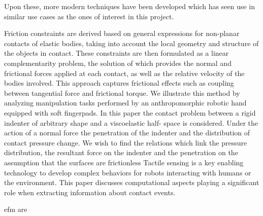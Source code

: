 Upon these, more modern techniques have been developed which has seen use in similar use cases as the ones of interest in this project.

Friction constraints are derived based on general expressions for non-planar contacts of elastic bodies, taking into account the local geometry and structure of the objects in contact. These constraints are then formulated as a linear complementarity problem, the solution of which provides the normal and frictional forces applied at each contact, as well as the relative velocity of the bodies involved. This approach captures frictional effects such as coupling between tangential force and frictional torque. We illustrate this method by analyzing manipulation tasks performed by an anthropomorphic robotic hand equipped with soft fingerpads\cite*{soft-finger-model-with-adaptive-contact-geometry-for-grasping-and-manipulation-tasks}.
In this paper the contact problem between a rigid indenter of arbitrary shape and a viscoelastic half-
space is considered. Under the action of a normal force the penetration of the indenter and the
distribution of contact pressure change. We wish to find the relations which link the pressure
distribution, the resultant force on the indenter and the penetration on the assumption that the surfaces
are frictionless\cite*{a-new-algorithm-for-computing-the-indentation-of-a-rigid-body-of-arbitrary-shape-on-a-viscoelastic-half-space}
Tactile sensing is a key enabling technology to develop complex behaviors for robots
interacting with humans or the environment. This paper discusses computational aspects playing
a significant role when extracting information about contact events\cite*{contact-modelling-and-tactile-data-processing-for-robot-skins}.



% 



\gls{efm} are 









